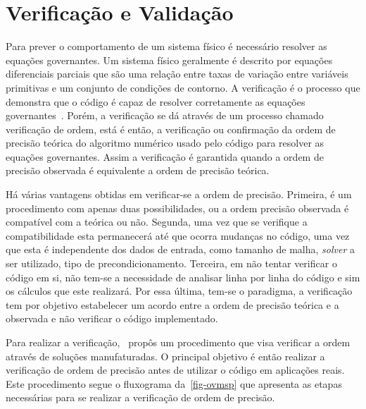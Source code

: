 \documentclass[
	12pt,				  %
	openright,		%
	twoside,			%
	a4paper,			%
	chapter=TITLE,		    %
	english,			%
	brazil				%
	]{abntex2}
\begin{document}
\section{Verificação e Validação}\label{chap:vv}

Para prever o comportamento de um sistema físico é necessário resolver
as equações governantes. Um sistema físico geralmente é descrito por equações
diferenciais parciais que são uma relação entre taxas de variação entre
variáveis primitivas e um conjunto de condições de contorno. A verificação é o
processo que demonstra que o código é capaz de resolver corretamente as
equações governantes~\cite{knupp2002}. Porém, a verificação se dá através de um processo
chamado verificação de ordem, está é então, a verificação ou confirmação da
ordem de precisão teórica do algoritmo numérico usado pelo código para
resolver as equações governantes. Assim a verificação é
garantida quando a ordem de precisão observada é equivalente a ordem de
precisão teórica. 

Há várias vantagens obtidas em verificar-se a ordem de precisão. Primeira, é
um procedimento com apenas duas possibilidades, ou a ordem precisão observada é
compatível com a teórica ou não. Segunda, uma vez que se verifique a
compatibilidade esta permanecerá até que ocorra mudanças no código, uma vez que esta
é independente dos dados de entrada, como tamanho de malha, \textit{solver} a
ser utilizado, tipo de precondicionamento. Terceira, em não tentar verificar o código
em si, não tem-se a necessidade de analisar linha por linha do código e sim os
cálculos que este realizará. Por essa última, tem-se o paradigma, a verificação
tem por objetivo estabelecer um acordo entre a ordem de precisão teórica e a
observada e não verificar o código implementado. 

Para realizar a verificação,~ propôs um procedimento que
visa verificar a ordem através de soluções manufaturadas. O
principal objetivo é então realizar a verificação de ordem de precisão antes de
utilizar o código em aplicações reais. Este procedimento segue o fluxograma
da~\autoref{fig-ovmsp} que apresenta as etapas necessárias para se realizar a
verificação de ordem de precisão. 
\end{document}
